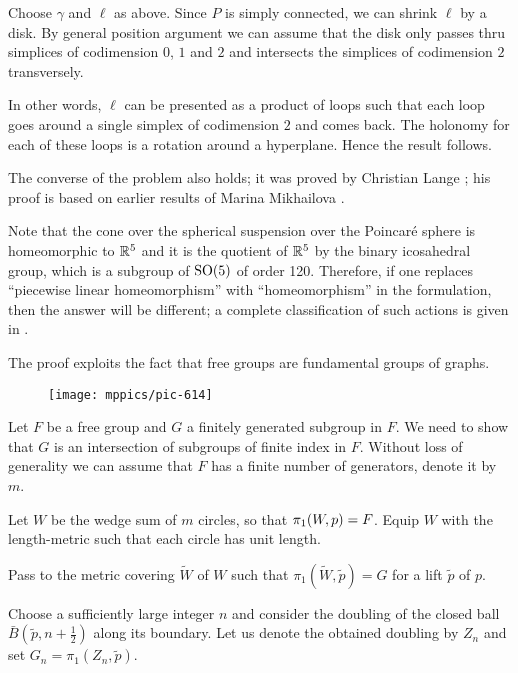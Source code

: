 Choose $\gamma$ and $\ell$ as above.
Since $P$ is simply connected, we can shrink $\ell$ by a disk.
By general position argument we can assume that the disk 
only passes thru simplices of codimension $0$, $1$ and $2$
and intersects the simplices of codimension $2$ transversely.

In other words, $\ell$ can be presented as a product of 
loops such that each loop goes around a single simplex of codimension $2$ and comes back.
The holonomy for each of these loops is a rotation around a hyperplane.
Hence the result follows.
\qeds

The converse of the problem also holds;
it was proved by Christian Lange \cite{lange};
his proof is based on earlier results of 
Marina Mikhailova \cite{mikhailova}.

Note that the cone over the spherical suspension over the Poincar\'e sphere is homeomorphic to $\mathbb{R}^5$ and it is the quotient of $\mathbb{R}^5$ by the binary icosahedral group, which is a subgroup of $\mathrm{SO}(5)$ of order 120. 
Therefore, 
if one replaces ``piecewise linear homeomorphism'' with ``homeomorphism'' in the formulation, 
then the answer will be different; 
a complete classification of such actions is given in \cite{lange}.

The proof exploits the fact that free groups are fundamental groups of graphs.


\begin{wrapfigure}{o}{38 mm}
\vskip-4mm
\centering
\texttt{[image: mppics/pic-614]}
\end{wrapfigure}

\medskip

Let $F$ be a free group and $G$ a finitely generated subgroup in $F$.
We need to show that $G$ is an intersection of subgroups of finite index in $F$.
Without loss of generality we can assume that $F$ has a finite number of generators, denote it by $m$.

Let $W$ be the wedge sum of $m$ circles, 
so that $\pi_1(W,p)\z=F$.
Equip $W$ with the length-metric 
such that each circle has unit length.

Pass to the metric covering $\tilde W$ of $W$ 
such that  $\pi_1(\tilde W,\tilde p)=G$ 
for a lift $\tilde p$ of $p$.

Choose a sufficiently large integer $n$ and consider the doubling of the closed ball $\bar B(\tilde p,n+\frac12)$ along  its boundary.
Let us denote the obtained doubling by $Z_n$ and set $G_n=\pi_1(Z_n,\tilde p)$.

